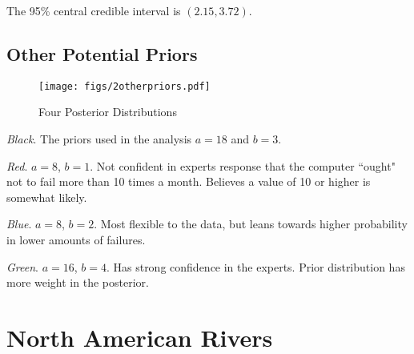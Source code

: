 \documentclass[12pt]{article}
\begin{document}
\noindent The 95\% central credible interval is $(2.15, 3.72)$.

\subsection{Other Potential Priors}

\begin{figure}[H]
\begin{center}
\texttt{[image: figs/2otherpriors.pdf]}
\caption{Four Posterior Distributions}
\end{center}
\end{figure}

\noindent \textit{Black}.  The priors used in the analysis $a=18$ and $b=3$.

\noindent \textit{Red}. $a=8$, $b=1$.  Not confident in experts response that the computer ``ought" not to fail more than 10 times a month.  Believes a value of 10 or higher is somewhat likely.

\noindent \textit{Blue}. $a=8$, $b=2$.  Most flexible to the data, but leans towards higher probability in lower amounts of failures.

\noindent \textit{Green}. $a=16$, $b=4$.  Has strong confidence in the experts.  Prior distribution has more weight in the posterior.


%
%

\newpage

\section{North American Rivers}
\end{document}

